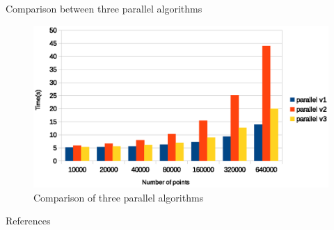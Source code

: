 \documentclass[
nopagebreaks,
style=klope,
fleqn]{powerdot}
\begin{document}
\begin{slide}{Comparison between three parallel algorithms}
  \begin{figure}[!h]
    \centering  
    \includegraphics[width=\linewidth]{fig/parallel_algorithm_comparison}
    \caption{Comparison of three parallel algorithms}
    \label{fig:par}
  \end{figure}
\end{slide}

\begin{slide} {References}
\footnotesize


\end{slide}
\end{document}
